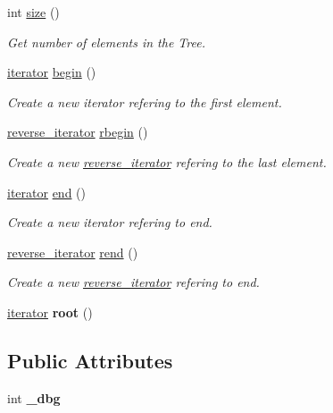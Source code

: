 \begin{DoxyCompactItemize}
\item 
int \hyperlink{classBTree_a3bb7a75716764713beb317b80ff32238}{size} ()
\begin{DoxyCompactList}\small\item\em Get number of elements in the Tree. \item\end{DoxyCompactList}\item 
\hyperlink{classBTree_1_1iterator}{iterator} \hyperlink{classBTree_aeb805dd429fe16186845e66e67a7e498}{begin} ()
\begin{DoxyCompactList}\small\item\em Create a new iterator refering to the first element. \item\end{DoxyCompactList}\item 
\hyperlink{classBTree_1_1reverse__iterator}{reverse\_\-iterator} \hyperlink{classBTree_a0fd7a5d6f77b6d55d1a6f12a6015159b}{rbegin} ()
\begin{DoxyCompactList}\small\item\em Create a new \hyperlink{classBTree_1_1reverse__iterator}{reverse\_\-iterator} refering to the last element. \item\end{DoxyCompactList}\item 
\hyperlink{classBTree_1_1iterator}{iterator} \hyperlink{classBTree_a84ac54a58e8fa886e6d3a61cef1ab8ad}{end} ()
\begin{DoxyCompactList}\small\item\em Create a new iterator refering to end. \item\end{DoxyCompactList}\item 
\hyperlink{classBTree_1_1reverse__iterator}{reverse\_\-iterator} \hyperlink{classBTree_ad2d647f5b6335d9ea5b9d34f5cb707d4}{rend} ()
\begin{DoxyCompactList}\small\item\em Create a new \hyperlink{classBTree_1_1reverse__iterator}{reverse\_\-iterator} refering to end. \item\end{DoxyCompactList}\item 
\hypertarget{classBTree_a74c65eb308a4351ada51582cec3ae7ea}{
\hyperlink{classBTree_1_1iterator}{iterator} {\bfseries root} ()}
\label{classBTree_a74c65eb308a4351ada51582cec3ae7ea}

\end{DoxyCompactItemize}
\subsection*{Public Attributes}
\begin{DoxyCompactItemize}
\item 
\hypertarget{classBTree_a01ae7e4c943cf39a84c01e738cf54e30}{
int {\bfseries \_\-dbg}}
\label{classBTree_a01ae7e4c943cf39a84c01e738cf54e30}

\end{DoxyCompactItemize}
